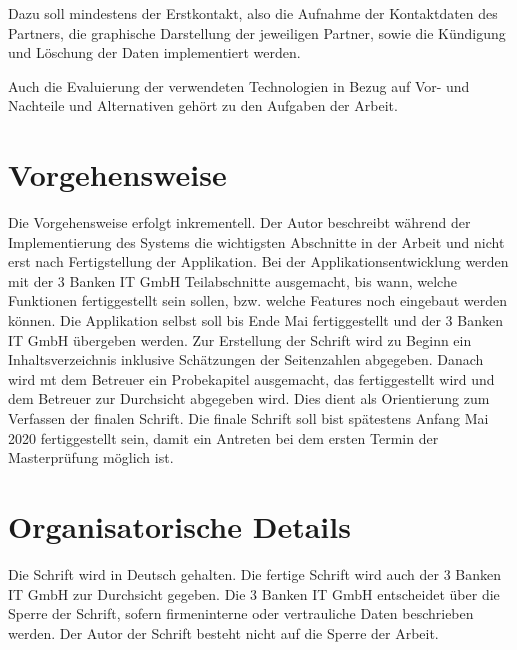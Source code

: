 \documentclass[master,german]{hgbthesis}
\begin{document}
Dazu soll mindestens der Erstkontakt, also die Aufnahme der Kontaktdaten des Partners, die graphische Darstellung der jeweiligen Partner, sowie die Kündigung und Löschung der Daten implementiert werden.

Auch die Evaluierung der verwendeten Technologien in Bezug auf Vor- und Nachteile und Alternativen gehört zu den Aufgaben der Arbeit.

\section{Vorgehensweise}
Die Vorgehensweise erfolgt inkrementell. Der Autor beschreibt während der Implementierung des Systems die wichtigsten Abschnitte in der Arbeit und nicht erst nach Fertigstellung der Applikation.
Bei der Applikationsentwicklung werden mit der 3 Banken IT GmbH Teilabschnitte ausgemacht, bis wann, welche Funktionen fertiggestellt sein sollen, bzw. welche Features noch eingebaut werden können. Die Applikation selbst soll bis Ende Mai fertiggestellt und der 3 Banken IT GmbH übergeben werden.
\newline \newline
Zur Erstellung der Schrift wird zu Beginn ein Inhaltsverzeichnis inklusive Schätzungen der Seitenzahlen abgegeben. Danach wird mt dem Betreuer ein Probekapitel ausgemacht, das fertiggestellt wird und dem Betreuer zur Durchsicht abgegeben wird. Dies dient als Orientierung zum Verfassen der finalen Schrift. Die finale Schrift soll bist spätestens Anfang Mai 2020 fertiggestellt sein, damit ein Antreten bei dem ersten Termin der Masterprüfung möglich ist.

\section{Organisatorische Details}
Die Schrift wird in Deutsch gehalten.
Die fertige Schrift wird auch der 3 Banken IT GmbH zur Durchsicht gegeben. Die 3 Banken IT GmbH entscheidet über die Sperre der Schrift, sofern firmeninterne oder vertrauliche Daten beschrieben werden. Der Autor der Schrift besteht nicht auf die Sperre der Arbeit.
\end{document}
